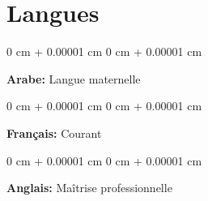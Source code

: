 \documentclass[10pt, letterpaper]{article}
\newenvironment{onecolentry}{
    \begin{adjustwidth}{
        0 cm + 0.00001 cm
    }{
        0 cm + 0.00001 cm
    }
}{
    \end{adjustwidth}
} %
\begin{document}
	\section{Langues}
	
	\begin{onecolentry}
		\textbf{Arabe:} Langue maternelle
	\end{onecolentry}
	
	\vspace{0.2 cm}
	
	\begin{onecolentry}
		\textbf{Français:} Courant
	\end{onecolentry}
	
	\vspace{0.2 cm}
	
	\begin{onecolentry}
		\textbf{Anglais:} Maîtrise professionnelle
	\end{onecolentry}
	
	
\end{document}
